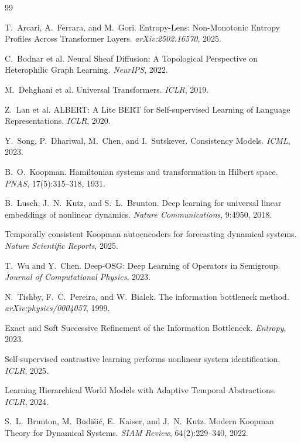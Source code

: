\documentclass[11pt, a4paper]{article}
\theoremstyle{plain}
\theoremstyle{remark}
\begin{document}
\begin{thebibliography}{99}

T.~Arcari, A.~Ferrara, and M.~Gori.
Entropy-Lens: Non-Monotonic Entropy Profiles Across Transformer Layers.
\emph{arXiv:2502.16570}, 2025.

C.~Bodnar et al.
Neural Sheaf Diffusion: A Topological Perspective on Heterophilic Graph Learning.
\emph{NeurIPS}, 2022.

M.~Dehghani et al.
Universal Transformers.
\emph{ICLR}, 2019.

Z.~Lan et al.
ALBERT: A Lite BERT for Self-supervised Learning of Language Representations.
\emph{ICLR}, 2020.

Y.~Song, P.~Dhariwal, M.~Chen, and I.~Sutskever.
\newblock Consistency Models.
\newblock \emph{ICML}, 2023.

B.~O.~Koopman.
\newblock Hamiltonian systems and transformation in Hilbert space.
\newblock \emph{PNAS}, 17(5):315--318, 1931.

B.~Lusch, J.~N.~Kutz, and S.~L.~Brunton.
\newblock Deep learning for universal linear embeddings of nonlinear dynamics.
\newblock \emph{Nature Communications}, 9:4950, 2018.

Temporally consistent Koopman autoencoders for forecasting dynamical systems.
\newblock \emph{Nature Scientific Reports}, 2025.

T.~Wu and Y.~Chen.
\newblock Deep-OSG: Deep Learning of Operators in Semigroup.
\newblock \emph{Journal of Computational Physics}, 2023.

N.~Tishby, F.~C.~Pereira, and W.~Bialek.
\newblock The information bottleneck method.
\newblock \emph{arXiv:physics/0004057}, 1999.

Exact and Soft Successive Refinement of the Information Bottleneck.
\newblock \emph{Entropy}, 2023.

Self-supervised contrastive learning performs nonlinear system identification.
\newblock \emph{ICLR}, 2025.

Learning Hierarchical World Models with Adaptive Temporal Abstractions.
\newblock \emph{ICLR}, 2024.

S.~L.~Brunton, M.~Budi\v{s}i\'{c}, E.~Kaiser, and J.~N.~Kutz.
\newblock Modern Koopman Theory for Dynamical Systems.
\newblock \emph{SIAM Review}, 64(2):229--340, 2022.


\end{thebibliography}
\end{document}
